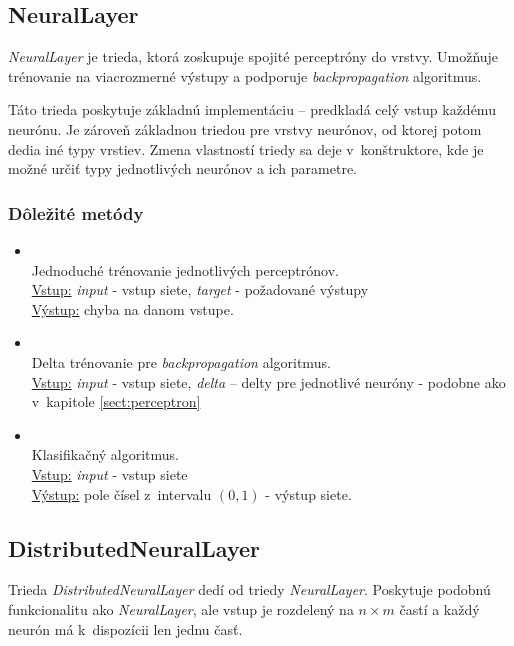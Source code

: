\subsection{NeuralLayer}
\textit{NeuralLayer} je trieda, ktorá zoskupuje spojité perceptróny do vrstvy. Umožňuje trénovanie na viacrozmerné výstupy a podporuje \textit{backpropagation} algoritmus. 

Táto trieda poskytuje základnú implementáciu -- predkladá celý vstup každému neurónu. Je zároveň základnou triedou pre vrstvy neurónov, od ktorej potom dedia iné typy vrstiev. Zmena vlastností triedy sa deje v~konštruktore, kde je možné určiť typy jednotlivých neurónov a ich parametre.

\subsubsection{Dôležité metódy}
\begin{itemize}
\item {}
\\Jednoduché trénovanie jednotlivých perceptrónov.
\\ \underline{Vstup:} \textit{input} - vstup siete, \textit{target} - požadované výstupy 
\\ \underline{Výstup:} chyba na danom vstupe.
\item {}
\\Delta trénovanie pre \textit{backpropagation} algoritmus.
\\ \underline{Vstup:} \textit{input} - vstup siete, \textit{delta} -- delty pre jednotlivé neuróny - podobne ako v~kapitole \ref{sect:perceptron}
\item {}
\\ Klasifikačný algoritmus.
\\ \underline{Vstup:} \textit{input} - vstup siete
\\ \underline{Výstup:} pole čísel z~intervalu $(0,1)$ - výstup siete.
\end{itemize}

\subsection{DistributedNeuralLayer}
Trieda \textit{DistributedNeuralLayer} dedí od triedy \textit{NeuralLayer}. Poskytuje podobnú funkcionalitu ako \textit{NeuralLayer}, ale vstup je rozdelený na $n\times m$ častí a každý neurón má k~dispozícii len jednu časť. 

